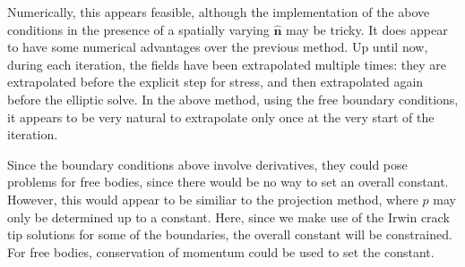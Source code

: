 \documentclass[12pt]{article}
\renewcommand{\vec}[1]{\mathbf{#1}}
\begin{document}
Numerically, this appears feasible, although the implementation of the above
conditions in the presence of a spatially varying $\hat{\vec{n}}$ may be
tricky. It does appear to have some numerical advantages over the previous
method. Up until now, during each iteration, the fields have been extrapolated
multiple times: they are extrapolated before the explicit step for stress, and
then extrapolated again before the elliptic solve. In the above method, using
the free boundary conditions, it appears to be very natural to extrapolate only
once at the very start of the iteration.

Since the boundary conditions above involve derivatives, they could pose
problems for free bodies, since there would be no way to set an overall
constant. However, this would appear to be similiar to the projection method,
where $p$ may only be determined up to a constant. Here, since we make use of
the Irwin crack tip solutions for some of the boundaries, the overall constant
will be constrained. For free bodies, conservation of momentum could be used
to set the constant.


\end{document}
